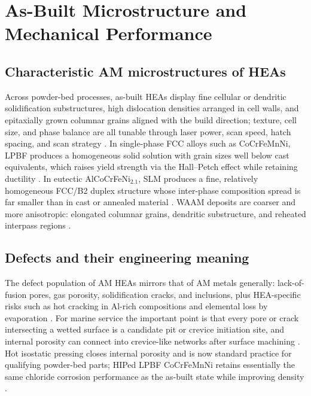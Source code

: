 \section{As-Built Microstructure and Mechanical Performance}
\label{sec:micro}

\subsection{Characteristic AM microstructures of HEAs}

Across powder-bed processes, as-built HEAs display fine cellular or dendritic solidification substructures, high dislocation densities arranged in cell walls, and epitaxially grown columnar grains aligned with the build direction; texture, cell size, and phase balance are all tunable through laser power, scan speed, hatch spacing, and scan strategy \cite{cagirici2024,han2025}. In single-phase FCC alloys such as CoCrFeMnNi, LPBF produces a homogeneous solid solution with grain sizes well below cast equivalents, which raises yield strength via the Hall--Petch effect while retaining ductility \cite{lpbf_cantor_2024}. In eutectic AlCoCrFeNi$_{2.1}$, SLM produces a fine, relatively homogeneous FCC/B2 duplex structure whose inter-phase composition spread is far smaller than in cast or annealed material \cite{slm_ehea_2025}. WAAM deposits are coarser and more anisotropic: elongated columnar grains, dendritic substructure, and reheated interpass regions \cite{andersson2026waam,liu2021waam}.

\subsection{Defects and their engineering meaning}

The defect population of AM HEAs mirrors that of AM metals generally: lack-of-fusion pores, gas porosity, solidification cracks, and inclusions, plus HEA-specific risks such as hot cracking in Al-rich compositions and elemental loss by evaporation \cite{cagirici2024}. For marine service the important point is that every pore or crack intersecting a wetted surface is a candidate pit or crevice initiation site, and internal porosity can connect into crevice-like networks after surface machining \cite{nass2025marine}. Hot isostatic pressing closes internal porosity and is now standard practice for qualifying powder-bed parts; HIPed LPBF CoCrFeMnNi retains essentially the same chloride corrosion performance as the as-built state while improving density \cite{lpbf_cantor_2024}.


